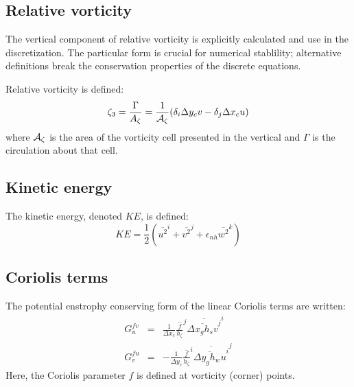 \subsection{Relative vorticity}

The vertical component of relative vorticity is explicitly calculated
and use in the discretization. The particular form is crucial for
numerical stablility; alternative definitions break the conservation
properties of the discrete equations.

Relative vorticity is defined:
\begin{equation}
\zeta_3 = \frac{\Gamma}{A_\zeta}
= \frac{1}{{\cal A}_\zeta} ( \delta_i \Delta y_c v - \delta_j \Delta x_c u )
\end{equation}
where ${\cal A}_\zeta$ is the area of the vorticity cell presented in
the vertical and $\Gamma$ is the circulation about that cell.



\subsection{Kinetic energy}

The kinetic energy, denoted $KE$, is defined:
\begin{equation}
KE = \frac{1}{2} ( \overline{ u^2 }^i + \overline{ v^2 }^j 
+ \epsilon_{nh} \overline{ w^2 }^k )
\end{equation}



\subsection{Coriolis terms}

The potential enstrophy conserving form of the linear Coriolis terms
are written:
\begin{eqnarray}
G_u^{fv} & = &
\frac{1}{\Delta x_c}
\overline{ \frac{f}{h_\zeta} }^j \overline{ \overline{ \Delta x_g h_s v }^j }^i \\
G_v^{fu} & = & -
\frac{1}{\Delta y_c}
\overline{ \frac{f}{h_\zeta} }^i \overline{ \overline{ \Delta y_g h_w u }^i }^j
\end{eqnarray}
Here, the Coriolis parameter $f$ is defined at vorticity (corner)
points.

